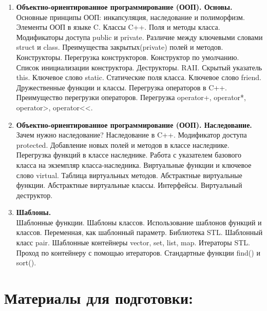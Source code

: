 \documentclass{article}
\begin{document}
\begin{enumerate}
\item \textbf{Объектно-ориентированное программирование (ООП). Основы.}\\
Основные принципы ООП: инкапсуляция, наследование и полиморфизм. Элементы ООП в языке C. Классы C++. Поля и методы класса. Модификаторы доступа public и private. Различие между ключевыми словами struct и class. Преимущества закрытых(private) полей и методов. Конструкторы. Перегрузка конструкторов. Конструктор по умолчанию. Список инициализации конструктора. Деструкторы. RAII. Скрытый указатель this. Ключевое слово static. Статические поля класса. Ключевое слово friend. Дружественные функции и классы. Перегрузка операторов в C++. Преимущество перегрузки операторов. Перегрузка operator+, operator*, operator>, operator<<.

\item \textbf{Объектно-ориентированное программирование (ООП). Наследование.}\\
Зачем нужно наследование? Наследование в C++. Модификатор доступа protected. Добавление новых полей и методов в классе наследнике. Перегрузка функций в классе наследнике. Работа с указателем базового класса на экземпляр класса-наследника. Виртуальные функции и ключевое слово virtual. Таблица виртуальных методов. Абстрактные виртуальные функции. Абстрактные виртуальные классы. Интерфейсы. Виртуальный деструктор.

\item \textbf{Шаблоны.}\\
Шаблонные функции. Шаблоны классов. Использование шаблонов функций и классов. Переменная, как шаблонный параметр. Библиотека STL. Шаблонный класс pair. Шаблонные контейнеры vector, set, list, map. Итераторы STL. Проход по контейнеру с помощью итераторов. Стандартные функции find() и sort().

\end{enumerate}



\newpage


\section*{Материалы для подготовки:}
\end{document}
